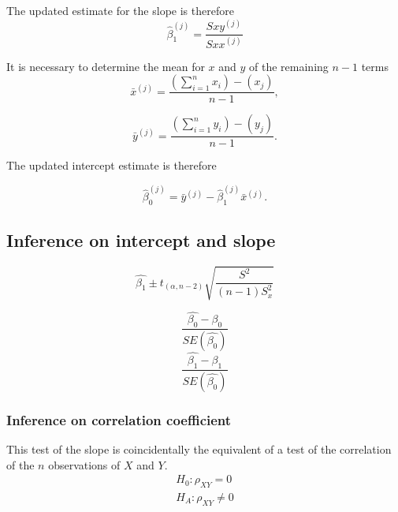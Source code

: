 \documentclass[12pt, a4paper]{report}
\theoremstyle{plain}
\theoremstyle{definition}
\theoremstyle{remark}
\begin{document}
The updated estimate for the slope is therefore
\begin{equation}
\hat{\beta}_{1}^{(j)}=\frac{Sxy^{(j)}}{Sxx^{(j)}}
\end{equation}


It is necessary to determine the mean for $x$ and $y$ of the
remaining $n-1$ terms
\begin{equation}
\bar{x}^{(j)}=\frac{(\sum_{i=1}^{n}x_{i})-(x_{j})}{n-1},
\end{equation}


\begin{equation}
\bar{y}^{(j)}=\frac{(\sum_{i=1}^{n}y_{i})-(y_{j})}{n-1}.
\end{equation}


The updated intercept estimate is therefore


\begin{equation}
\hat{\beta}_{0}^{(j)}=\bar{y}^{(j)}-\hat{\beta}_{1}^{(j)}\bar{x}^{(j)}.
\end{equation}


\subsection{Inference on intercept and slope}
\begin{equation}
\hat{\beta_{1}} \pm t_{(\alpha, n-2) }
\sqrt{\frac{S^2}{(n-1)S^{2}_{x}}}
\end{equation}


\begin{equation}
\frac{\hat{\beta_{0}}-\beta_{0}}{SE(\hat{\beta_{0}})}
\end{equation}
\begin{equation}
\frac{\hat{\beta_{1}}-\beta_{1}}{SE(\hat{\beta_{0}})}
\end{equation}




\subsubsection{Inference on correlation coefficient} This test of
the slope is coincidentally the equivalent of a test of the
correlation of the $n$ observations of $X$ and $Y$.
\begin{eqnarray}
H_{0}: \rho_{XY} = 0 \nonumber \\
H_{A}: \rho_{XY} \ne 0 \nonumber \\
\end{eqnarray}


\newpage
\end{document}
